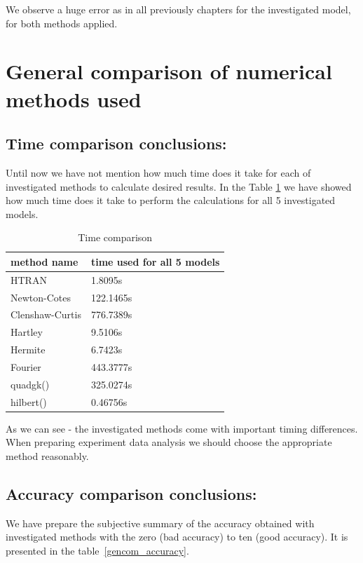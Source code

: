 \documentclass[12pt,twoside,a4paper]{article}
\numberwithin{equation}{subsection}
\numberwithin{figure}{subsection}
\begin{document}
We observe a huge error as in all previously chapters for the investigated model, for both methods applied.

\section{General comparison of numerical methods used} \label{chap:comparison}

\subsection{Time comparison conclusions:} \label{chap:gencom_time}

Until now we have not mention how much time does it take for each of investigated methods to calculate desired results. In the
Table \ref{gencom_time} we have showed how much time does it take to perform the calculations for all 5 investigated models.

\begin{table}
  \caption{Time comparison} \label{gencom_time} 
  \begin{tabular}{l l}
    method name  &  time used for all 5 models \\
    \hline
    HTRAN & 1.8095s \\
    Newton-Cotes &  122.1465s \\
    Clenshaw-Curtis & 776.7389s \\
    Hartley & 9.5106s \\
    Hermite & 6.7423s \\
    Fourier & 443.3777s \\
    quadgk() & 325.0274s \\
    hilbert() & 0.46756s \\
    \hline
  \end{tabular}
\end{table} 

As we can see - the investigated methods come with important timing differences. When preparing experiment data analysis we should
choose the appropriate method reasonably.

\subsection{Accuracy comparison conclusions:} \label{chap:gencom_accuracy}

We have prepare the subjective summary of the accuracy obtained with investigated methods with the zero (bad accuracy) to ten
(good accuracy). It is presented in the table~\ref{gencom_accuracy}.
\end{document}
